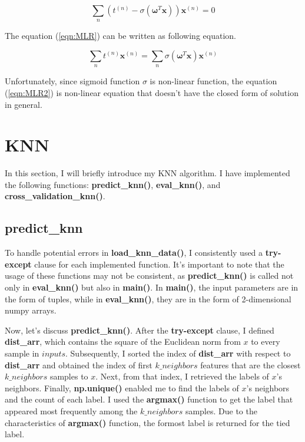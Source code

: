 \documentclass[12pt]{article}
\begin{document}
\begin{equation}
    \sum_n\left(t^{(n)} - \sigma(\boldsymbol{\omega}^T\boldsymbol{x})\right)\boldsymbol{x}^{(n)} = 0
    \label{eqn:MLR}
\end{equation}

The equation (\ref{eqn:MLR}) can be written as following equation.

\begin{equation}
    \sum_n t^{(n)}\boldsymbol{x}^{(n)} = \sum_n\sigma(\boldsymbol{\omega}^T\boldsymbol{x})\boldsymbol{x}^{(n)}
    \label{eqn:MLR2}
\end{equation}

Unfortunately, since sigmoid function $\sigma$ is non-linear function, the equation (\ref{eqn:MLR2}) is non-linear equation that doesn't have the closed form of solution in general.

\section{KNN}

In this section, I will briefly introduce my KNN algorithm. I have implemented the following functions: \textbf{predict\_knn()}, \textbf{eval\_knn()}, and \textbf{cross\_validation\_knn()}.

\subsection{predict\_knn}

To handle potential errors in \textbf{load\_knn\_data()}, I consistently used a \textbf{try-except} clause for each implemented function. It's important to note that the usage of these functions may not be consistent, as \textbf{predict\_knn()} is called not only in \textbf{eval\_knn()} but also in \textbf{main()}. In \textbf{main()}, the input parameters are in the form of tuples, while in \textbf{eval\_knn()}, they are in the form of 2-dimensional numpy arrays.

Now, let's discuss \textbf{predict\_knn()}. After the \textbf{try-except} clause, I defined \textbf{dist\_arr}, which contains the square of the Euclidean norm from $x$ to every sample in $inputs$. Subsequently, I sorted the index of \textbf{dist\_arr} with respect to \textbf{dist\_arr} and obtained the index of first $k\_neighbors$ features that are the closest $k\_neighbors$ samples to $x$. Next, from that index, I retrieved the labels of $x$'s neighbors. Finally, \textbf{np.unique()} enabled me to find the labels of $x$'s neighbors and the count of each label. I used the \textbf{argmax()} function to get the label that appeared most frequently among the $k\_neighbors$ samples.  Due to the characteristics of \textbf{argmax()} function, the formost label is returned for the tied label.
\end{document}
